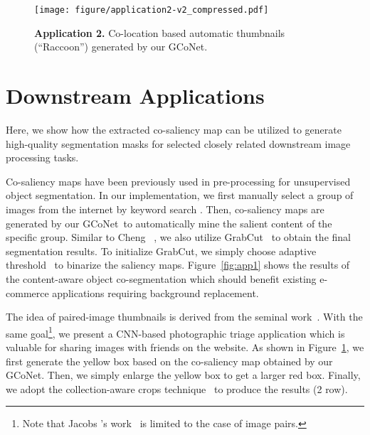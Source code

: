 \documentclass[final]{cvpr}
\def\ourmodel{GCoNet}
\begin{document}
\begin{figure}
\begin{center}
\texttt{[image: figure/application2-v2\_compressed.pdf]}
\end{center}
\vspace{-10pt}
\caption{\textbf{Application 2.} Co-location based automatic thumbnails (``Raccoon'') generated by our \ourmodel.}
\label{fig:app2}
\end{figure}



\section{Downstream Applications}
Here, we show how the extracted co-saliency map can be utilized to generate high-quality segmentation masks for selected closely related downstream image processing tasks. 

Co-saliency maps have been previously used in pre-processing for unsupervised object segmentation. In our implementation, we first manually select a group of images from the internet by keyword search . Then, co-saliency maps are generated by our \ourmodel~to automatically mine the salient content of the specific group. Similar to Cheng \etal~\cite{cheng2014global}, we also utilize GrabCut~\cite{rother2012interactive} to obtain the final segmentation results. To initialize GrabCut, we simply choose adaptive threshold~\cite{peng2014rgbd} to binarize the saliency maps. 
Figure~\ref{fig:app1} shows the results of the content-aware object co-segmentation which should benefit  existing e-commerce applications requiring background replacement.

The idea of paired-image thumbnails is derived from the seminal work~\cite{jacobs2010cosaliency}. With the same goal\footnote{Note that Jacobs \etal's work~\cite{jacobs2010cosaliency} is limited to the case of image pairs. }, 
we present a CNN-based photographic triage application which is valuable for sharing images with friends on the website. As shown in Figure~\ref{fig:app2}, we first generate the yellow box based on the co-saliency map obtained by our \ourmodel. Then, we simply enlarge the yellow box to get a larger red box. Finally, we adopt the collection-aware crops technique~\cite{jacobs2010cosaliency} to produce the results (2 row). 
\end{document}
